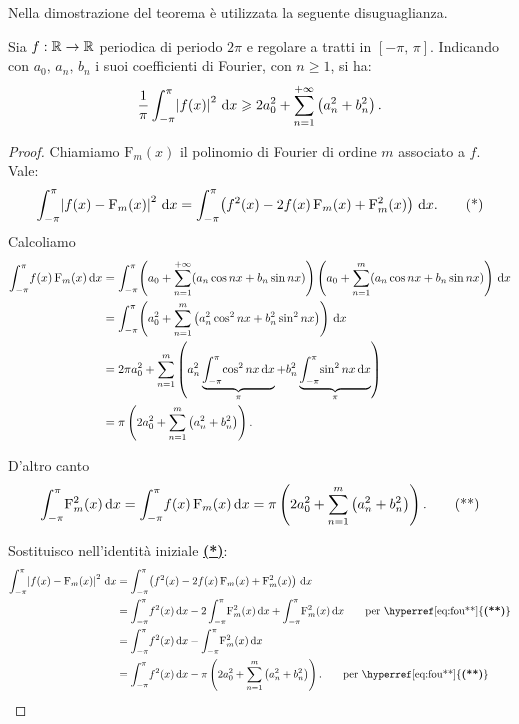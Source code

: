 \documentclass[../../analisi2]{subfiles}
\begin{document}
        Nella dimostrazione del teorema è utilizzata la seguente disuguaglianza.

        \begin{teorema}
            Sia \(f : \mathbb{R} \to \mathbb{R}\) periodica di periodo \(2\pi\) e regolare a tratti in \([-\pi, \, \pi]\). Indicando con
            \(a_0, \, a_n, \, b_n\) i suoi coefficienti di Fourier, con \(n \geqslant 1\), si ha:
            \[
                \frac{1}{\pi} \int_{-\pi}^{\pi} \! \left|f(x)\right|^2 \, \mathrm{d}x \geqslant 2 a_0^2 + \sum_{n = 1}^{+\infty} \left(a_n^2 + b_n^2\right).
            \]
        \end{teorema}
        \begin{proof}
            Chiamiamo \(\mathrm{F}_m (x)\) il polinomio di Fourier di ordine \(m\) associato a \(f\). Vale:
            \[
                \int_{-\pi}^{\pi} \! \left|f(x) - \mathrm{F}_m (x)\right|^2 \, \mathrm{d}x = \int_{-\pi}^{\pi} \! \left(f^2(x) - 2 f(x) \, \mathrm{F}_m (x) + \mathrm{F}_m^2 (x)\right) \, \mathrm{d}x.\tag{*}\label{eq:fou*}
            \]
            Calcoliamo
            \begin{align*}
                \int_{-\pi}^{\pi} \! f(x) \, \mathrm{F}_m (x) \, \mathrm{d}x &= \int_{-\pi}^{\pi} \! \left(a_0 + \sum_{n = 1}^{+\infty} (a_n \cos nx + b_n \sin nx)\right)
                    \left(a_0 + \sum_{n = 1}^{m} (a_n \cos nx + b_n \sin nx)\right) \, \mathrm{d}x\\
                &= \int_{-\pi}^{\pi} \! \left(a_0^2 + \sum_{n = 1}^m \left(a_n^2 \cos^2 nx + b_n^2 \sin^2 nx\right)\right) \, \mathrm{d}x\\
                &= 2\pi a_0^2 + \sum_{n = 1}^m \left(a_n^2 \underbrace{\int_{-\pi}^{\pi} \! \cos^2 nx \, \mathrm{d}x}_{\pi} + b_n^2 \underbrace{\int_{-\pi}^{\pi} \! \sin^2 nx \, \mathrm{d}x}_{\pi}\right)\\
                &= \pi \left(2 a_0^2 + \sum_{n = 1}^m \left(a_n^2 + b_n^2\right)\right).
            \end{align*}

            D'altro canto
            \[
                \int_{-\pi}^{\pi} \! \mathrm{F}_m^2 (x) \, \mathrm{d}x = \int_{-\pi}^{\pi} \! f(x) \, \mathrm{F}_m (x) \, \mathrm{d}x = \pi \left(2 a_0^2 + \sum_{n = 1}^m \left(a_n^2 + b_n^2\right)\right).\tag{**}\label{eq:fou**}
            \]

            Sostituisco nell'identità iniziale \hyperref[eq:fou*]{\textbf{(*)}}:
            \begin{align*}
                \intDef{-\pi}{\pi}{\left|f(x) - \mathrm{F}_m (x)\right|^2}{x} &= \intDef{-\pi}{\pi}{\left(f^2(x) - 2 f(x) \, \mathrm{F}_m (x) + \mathrm{F}_m^2 (x)\right)}{x}\\
                &= \intDef{-\pi}{\pi}{f^2 (x)}{x} - 2\intDef{-\pi}{\pi}{\mathrm{F}_m^2 (x)}{x} + \intDef{-\pi}{\pi}{\mathrm{F}_m^2 (x)}{x} \qquad \text{per \hyperref[eq:fou**]{\textbf{(**)}}}\\
                &= \intDef{-\pi}{\pi}{f^2 (x)}{x} - \intDef{-\pi}{\pi}{\mathrm{F}_m^2 (x)}{x}\\
                &= \intDef{-\pi}{\pi}{f^2(x)}{x} - \pi \left(2 a_0^2 + \sum_{n = 1}^m \left(a_n^2 + b_n^2\right)\right). \qquad \text{per \hyperref[eq:fou**]{\textbf{(**)}}}
            \end{align*}


\end{proof}
\end{document}
